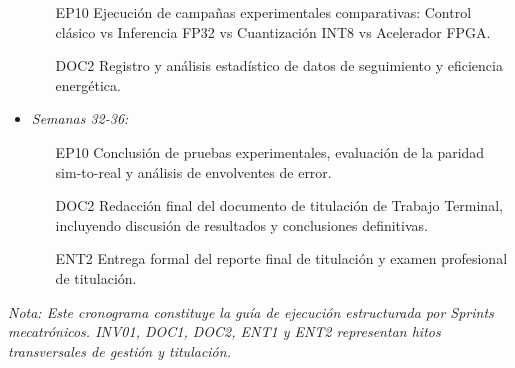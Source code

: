 \documentclass[12pt]{article}
\begin{document}
\begin{itemize}
\begin{itemize}
            \item [EP10] Ejecución de campañas experimentales comparativas: Control clásico vs Inferencia FP32 vs Cuantización INT8 vs Acelerador FPGA.
            \item [DOC2] Registro y análisis estadístico de datos de seguimiento y eficiencia energética.
        \end{itemize}
    \item \textit{Semanas 32-36:}
        \begin{itemize}
            \item [EP10] Conclusión de pruebas experimentales, evaluación de la paridad sim-to-real y análisis de envolventes de error.
            \item [DOC2] Redacción final del documento de titulación de Trabajo Terminal, incluyendo discusión de resultados y conclusiones definitivas.
            \item [ENT2] Entrega formal del reporte final de titulación y examen profesional de titulación.
        \end{itemize}
\end{itemize}
\textit{Nota: Este cronograma constituye la guía de ejecución estructurada por Sprints mecatrónicos. INV01, DOC1, DOC2, ENT1 y ENT2 representan hitos transversales de gestión y titulación.}

\newpage
{}


\end{document}
